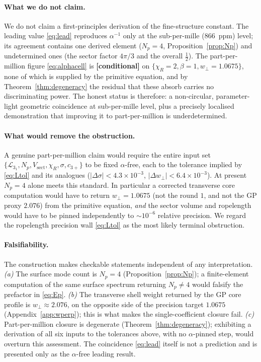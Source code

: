 \documentclass[11pt,a4paper]{article}
\theoremstyle{definition}
\newcommand{\conditional}{\textbf{[conditional]}}
\begin{document}
\paragraph{What we do not claim.}
We do not claim a first-principles derivation of the fine-structure constant. The
leading value \eqref{eq:lead} reproduces $\alpha^{-1}$ only at the sub-per-mille
($866$~ppm) level; its agreement contains one derived element ($N_p=4$,
Proposition~\ref{prop:Np}) and undetermined ones (the sector factor $4\pi/3$ and
the overall $\tfrac12$). The part-per-million figure \eqref{eq:alphacell} is
\conditional{} on $\{\chi_R=2,\beta=1,w_\perp=1.0675\}$, none of which is supplied
by the primitive equation, and by Theorem~\ref{thm:degeneracy} the residual that
these absorb carries no discriminating power. The honest status is therefore: a
non-circular, parameter-light geometric coincidence at sub-per-mille level, plus a
precisely localised demonstration that improving it to part-per-million is
underdetermined.

\paragraph{What would remove the obstruction.}
A genuine part-per-million claim would require the entire input set
$\{\mathcal{L}_{3_1},N_p,V_{\mathrm{sect}},\chi_R,\sigma,c_{3+}\}$ to be fixed
$\alpha$-free, each to the tolerance implied by \eqref{eq:Ltol} and its analogues
($|\Delta\sigma|<4.3\times10^{-3}$, $|\Delta w_\perp|<6.4\times10^{-3}$). At
present $N_p=4$ alone meets this standard. In particular a corrected transverse
core computation would have to return $w_\perp=1.0675$ (not the round $1$, and not
the GP proxy $2.076$) from the primitive equation, \emph{and} the sector volume
and ropelength would have to be pinned independently to $\sim10^{-6}$ relative
precision. We regard the ropelength precision wall \eqref{eq:Ltol} as the most
likely terminal obstruction.

\paragraph{Falsifiability.}
The construction makes checkable statements independent of any interpretation.
\emph{(a)} The surface mode count is $N_p=4$ (Proposition~\ref{prop:Np}); a
finite-element computation of the same surface spectrum returning $N_p\neq4$ would
falsify the prefactor in \eqref{eq:Ep}. \emph{(b)} The transverse shell weight
returned by the GP core profile is $w_\perp\approx2.076$, on the opposite side of
the precision target $1.0675$ (Appendix~\ref{app:wperp}); this is what makes the
single-coefficient closure fail. \emph{(c)} Part-per-million closure is
degenerate (Theorem~\ref{thm:degeneracy}); exhibiting a derivation of all six
inputs to the tolerances above, with no $\alpha$-pinned step, would overturn this
assessment. The coincidence \eqref{eq:lead} itself is not a prediction and is
presented only as the $\alpha$-free leading result.
\end{document}
